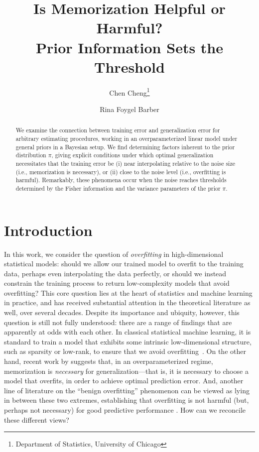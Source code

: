 \documentclass[11pt]{article}
\title{Is Memorization Helpful or Harmful? \\ Prior Information Sets the Threshold}
\author{%
	Chen Cheng\thanks{Department of Statistics, University of Chicago} \and Rina Foygel Barber\samethanks
}
\newcommand{\jfunc}{\mathsf{J}}
\begin{document}
\maketitle

\begin{abstract}
    We examine the connection between training error and generalization error for arbitrary estimating procedures, working in an overparameterized linear model under general priors in a Bayesian setup. We find determining factors inherent to the prior distribution $\pi$, giving explicit conditions under which optimal generalization necessitates that the training error be (i) near interpolating relative to the noise size (i.e., memorization is necessary), or (ii) close to the noise level (i.e., overfitting is harmful). Remarkably, these phenomena occur when the noise reaches thresholds determined by the Fisher information and the variance parameters of the prior $\pi$.
    
\end{abstract}


\section{Introduction}

In this work, we consider the question of \emph{overfitting} in high-dimensional statistical models: should we allow our trained model to overfit to the training data, perhaps even interpolating the data perfectly, or should we instead constrain the training process to return low-complexity models that avoid overfitting? This core question lies at the heart of statistics and machine learning in practice, and has received substantial attention in the theoretical literature as well, over several decades. Despite its importance and ubiquity, however, this question is still not fully understood: there are a range of findings that are apparently at odds with each other.
In classical statistical machine learning, it is standard to train a model that exhibits some intrinsic low-dimensional structure, such as sparsity or low-rank, to ensure that we avoid overfitting~\citep{tibshirani1996regression, candes2008enhancing, candes2012exact}.
On the other hand, recent work by \citet{cheng2022memorize} suggests that, in an overparameterized regime, memorization is \emph{necessary} for generalization---that is, it is necessary to choose a model that overfits, in order to achieve optimal prediction error. 
And, another line of literature on the ``benign overfitting'' phenomenon can be viewed as lying in between these two extremes, establishing that overfitting is not harmful (but, perhaps not necessary) for good predictive performance \citep{belkin2018overfitting, belkin2019does, bartlett2020benign, hastie2022surprises, cheng2024dimension}. How can we reconcile these different views?
\end{document}
